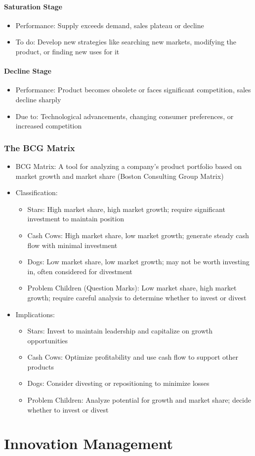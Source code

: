 \documentclass[openany,12pt,a4paper]{book}
\begin{document}
\subsubsection{Saturation Stage}
\begin{itemize}
    \item Performance: Supply exceeds demand, sales plateau or decline
    \item To do: Develop new strategies like searching new markets, modifying the product, or finding new uses for it
\end{itemize}
\subsubsection{Decline Stage}
\begin{itemize}
    \item Performance: Product becomes obsolete or faces significant competition, sales decline sharply
    \item Due to: Technological advancements, changing consumer preferences, or increased competition
\end{itemize}

\subsection{The BCG Matrix}
\begin{itemize}
    \item BCG Matrix: A tool for analyzing a company's product portfolio based on market growth and market share (Boston Consulting Group Matrix)
    \item Classification:
    \begin{itemize}
        \item Stars: High market share, high market growth; require significant investment to maintain position
        \item Cash Cows: High market share, low market growth; generate steady cash flow with minimal investment
        \item Dogs: Low market share, low market growth; may not be worth investing in, often considered for divestment
        \item Problem Children (Question Marks): Low market share, high market growth; require careful analysis to determine whether to invest or divest
    \end{itemize}
    \item Implications:
    \begin{itemize}
        \item Stars: Invest to maintain leadership and capitalize on growth opportunities
        \item Cash Cows: Optimize profitability and use cash flow to support other products
        \item Dogs: Consider divesting or repositioning to minimize losses
        \item Problem Children: Analyze potential for growth and market share; decide whether to invest or divest
    \end{itemize}
\end{itemize}

\chapter{Innovation Management}
\end{document}
